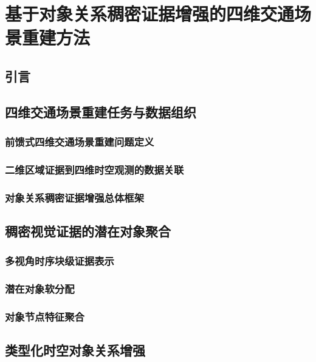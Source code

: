 
\chapter{基于对象关系稠密证据增强的四维交通场景重建方法}

\section{引言}

\section{四维交通场景重建任务与数据组织}

\subsection{前馈式四维交通场景重建问题定义}

\subsection{二维区域证据到四维时空观测的数据关联}

\subsection{对象关系稠密证据增强总体框架}

\section{稠密视觉证据的潜在对象聚合}

\subsection{多视角时序块级证据表示}

\subsection{潜在对象软分配}

\subsection{对象节点特征聚合}

\section{类型化时空对象关系增强}

